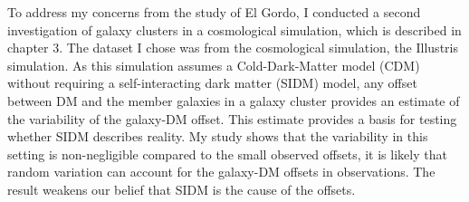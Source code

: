 \documentclass[ucdthesis.tex]{subfiles}
\begin{document}
		To address my concerns from the study of El Gordo, 
		I conducted a second investigation of galaxy clusters in a cosmological
		simulation, which is described in chapter 3. The dataset I chose was from the 
		cosmological simulation, the Illustris simulation. As this simulation
		assumes a Cold-Dark-Matter model (CDM) without requiring a self-interacting
		dark matter (SIDM) model, any offset between DM and the member galaxies in a 
		galaxy cluster provides an estimate of the variability of the galaxy-DM offset. This
		estimate provides a basis for testing whether SIDM describes reality. My
		study shows that 
		the variability in this setting is non-negligible compared to the
		small observed offsets, it is
		likely that random variation can account for the
		galaxy-DM offsets in observations. The result weakens our belief that SIDM is the
		cause of the offsets. 
\end{document}
